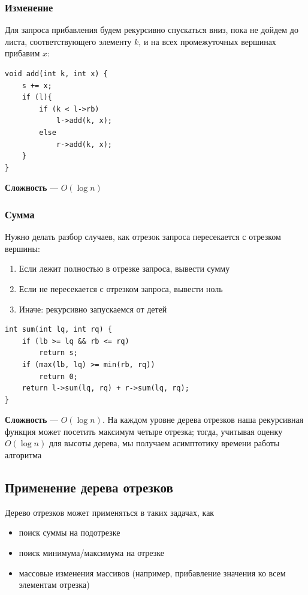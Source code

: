 \documentclass[a4paper]{article}
\begin{document}
\subsubsection{Изменение}
Для запроса прибавления будем рекурсивно спускаться вниз, пока не дойдем до листа, соответствующего элементу $k$, и на всех промежуточных вершинах прибавим $x$:

\begin{lstlisting}
void add(int k, int x) {
    s += x;
    if (l){
        if (k < l->rb)
            l->add(k, x);
        else
            r->add(k, x);
    }
}
\end{lstlisting}

\textbf{Сложность} — $O(\log n)$

\subsubsection{Сумма}
Нужно делать разбор случаев, как отрезок запроса пересекается с отрезком вершины:

\begin{enumerate}
    \item Если лежит полностью в отрезке запроса, вывести сумму
    \item Если не пересекается с отрезком запроса, вывести ноль
    \item Иначе: рекурсивно запускаемся от детей
\end{enumerate}

\begin{lstlisting}
int sum(int lq, int rq) {
    if (lb >= lq && rb <= rq)
        return s;
    if (max(lb, lq) >= min(rb, rq))
        return 0;
    return l->sum(lq, rq) + r->sum(lq, rq);
}
\end{lstlisting}

\textbf{Сложность} — $O(\log n)$. На каждом уровне дерева отрезков наша рекурсивная функция может посетить максимум четыре отрезка; тогда, учитывая оценку $O(\log n)$ для высоты дерева, мы получаем асимптотику времени работы алгоритма


\subsection{Применение дерева отрезков}
Дерево отрезков может применяться в таких задачах, как

\begin{itemize}
    \item поиск суммы на подотрезке
    \item поиск минимума/максимума на отрезке
    \item массовые изменения массивов (например, прибавление значения ко всем элементам отрезка)
\end{itemize}
\end{document}

